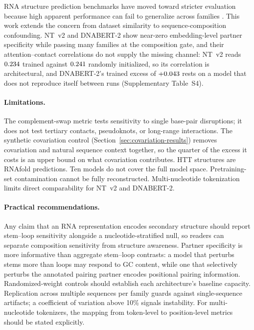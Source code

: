 \documentclass[11pt]{article}
\begin{document}
RNA structure prediction benchmarks have moved toward stricter evaluation
because high apparent performance can fail to generalize across families
\citep{szikszai2022generalization}. This work extends the concern from
dataset similarity to sequence-composition confounding. NT~v2 and DNABERT-2
show near-zero embedding-level partner specificity while passing many families
at the composition gate, and their attention--contact correlations do not
supply the missing channel: NT~v2 reads $0.234{}$ trained against
$0.241{}$ randomly initialized, so its correlation is
architectural, and DNABERT-2's trained excess of $+0.043{}$ rests
on a model that does not reproduce itself between runs
(Supplementary Table~S4).

\paragraph{Limitations.}
The complement-swap metric tests sensitivity to single base-pair disruptions;
it does not test tertiary contacts, pseudoknots, or long-range interactions.
The synthetic covariation control (Section~\ref{sec:covariation-results})
removes covariation and natural sequence context together, so the quarter of
the excess it costs is an upper bound on what covariation contributes. HTT structures
are RNAfold predictions. Ten models do not cover the full model space. Pretraining-set contamination cannot be
fully reconstructed. Multi-nucleotide tokenization limits direct
comparability for NT~v2 and DNABERT-2.

\paragraph{Practical recommendations.}
Any claim that an RNA representation encodes secondary structure should
report stem--loop sensitivity alongside a nucleotide-stratified null, so
readers can separate composition sensitivity from structure awareness.
Partner specificity is more informative than aggregate stem--loop contrasts:
a model that perturbs stems more than loops may respond to GC content, while
one that selectively perturbs the annotated pairing partner encodes
positional pairing information. Randomized-weight controls should establish
each architecture's baseline capacity. Replication across
multiple sequences per family guards against single-sequence artifacts; a
coefficient of variation above 10\% signals instability. For
multi-nucleotide tokenizers, the mapping from token-level to position-level
metrics should be stated explicitly.
\end{document}
